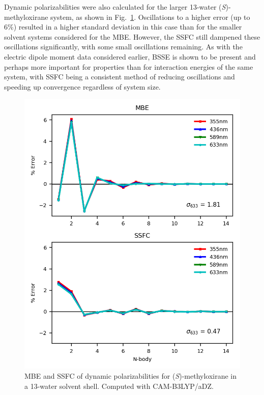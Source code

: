         Dynamic polarizabilities were also calculated for the larger 13-water (\textit{S})-methyloxirane system, as shown in Fig.\ \ref{metox_13_pol}. Oscillations to a higher error (up to 6\%) resulted in a higher standard deviation in this case than for the smaller solvent systems considered for the MBE.  However, the SSFC still dampened these oscillations significantly, with some small oscillations remaining. As with the electric dipole moment data considered earlier, BSSE is shown to be present and perhaps more important for properties than for interaction energies of the same system, with SSFC being a consistent method of reducing oscillations and speeding up convergence regardless of system size. 
        \begin{figure}
            \centering
            \includegraphics[scale=0.75]{p1/graphs/metox_13_pol.png}
            \caption{MBE and SSFC of dynamic polarizabilities for (\textit{S})-methyloxirane in a 13-water solvent shell. Computed with CAM-B3LYP/aDZ.}
            \label{metox_13_pol}
        \end{figure}

